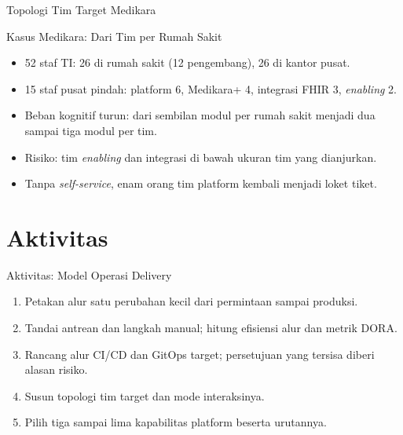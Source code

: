 \documentclass[aspectratio=169, table, 12pt]{beamer}
\begin{document}
\begin{frame}{{\Large Topologi Tim Target Medikara}}
  \centering
\end{frame}

\begin{frame}{{\Large Kasus Medikara: Dari Tim per Rumah Sakit}}
  \vspace{10pt}
  \begin{itemize}
    \item 52 staf TI: 26 di rumah sakit (12 pengembang), 26 di kantor pusat.
    \item 15 staf pusat pindah: platform 6, Medikara+ 4, integrasi FHIR 3, \textit{enabling} 2.
    \item Beban kognitif turun: dari sembilan modul per rumah sakit menjadi dua sampai tiga modul
          per tim.
    \item Risiko: tim \textit{enabling} dan integrasi di bawah ukuran tim yang dianjurkan.
    \item Tanpa \textit{self-service}, enam orang tim platform kembali menjadi loket tiket.
  \end{itemize}
\end{frame}

\section{Aktivitas}

\begin{frame}{{\Large Aktivitas: Model Operasi Delivery}}
  \vspace{10pt}
  \begin{enumerate}
    \item Petakan alur satu perubahan kecil dari permintaan sampai produksi.
    \item Tandai antrean dan langkah manual; hitung efisiensi alur dan metrik DORA.
    \item Rancang alur CI/CD dan GitOps target; persetujuan yang tersisa diberi alasan risiko.
    \item Susun topologi tim target dan mode interaksinya.
    \item Pilih tiga sampai lima kapabilitas platform beserta urutannya.
  \end{enumerate}
\end{frame}
\end{document}
